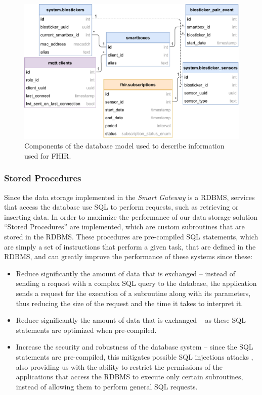 \begin{figure}[H]
    \centering
    \includegraphics[width=0.66\linewidth]{images/database-schema-fhir.pdf}
    \caption{Components of the database model used to describe information used for \acs{FHIR}.}
    \label{fig:wow-dbschema-fhir}
\end{figure}

\subsubsection{Stored Procedures}

Since the data storage implemented in the \textit{Smart Gateway} is a \acs{RDBMS}, services that access the database use \acf{SQL} to perform requests, such as retrieving or inserting data. In order to maximize the performance of our data storage solution ``Stored Procedures'' are implemented, which are custom subroutines that are stored in the \acs{RDBMS}. These procedures are pre-compiled \acs{SQL} statements, which are simply a set of instructions that perform a given task, that are defined in the \acs{RDBMS}, and can greatly improve the performance of these systems since these:

\begin{itemize}
    \item Reduce significantly the amount of data that is exchanged -- instead of sending a request with a complex \acs{SQL} query to the database, the application sends a request for the execution of a subroutine along with its parameters, thus reducing the size of the request and the time it takes to interpret it.
    \item Reduce significantly the amount of data that is exchanged -- as these \acs{SQL} statements are optimized when pre-compiled.
    \item Increase the security and robustness of the database system -- since the \acs{SQL} statements are pre-compiled, this mitigates possible \acs{SQL} injections attacks \cite{clarke2012sql}, also providing us with the ability to restrict the permissions of the applications that access the \acs{RDBMS} to execute only certain subroutines, instead of allowing them to perform general \acs{SQL} requests.
\end{itemize}

